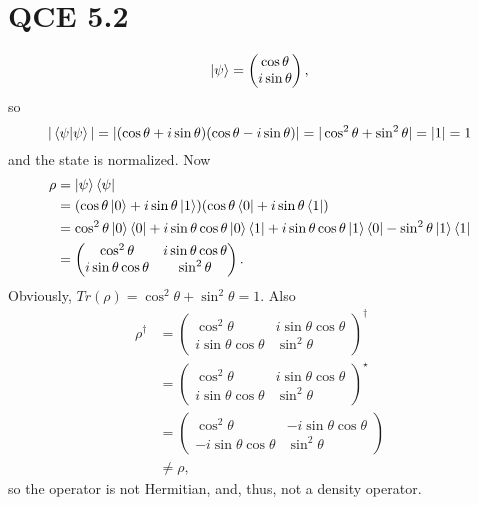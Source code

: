 \documentclass[10pt]{article}
\begin{document}
\section*{QCE 5.2}
\[
\ket{\psi} = \begin{pmatrix}
\cos \theta \\
i \sin \theta
\end{pmatrix},
\]
so 
\[
|\braket{\psi|\psi}| = |(\cos \theta + i \sin \theta)( \cos \theta - i \sin \theta )| = |\cos^2 \theta + \sin^2 \theta| = |1| = 1
\]
and the state is normalized.
Now 
\begin{align*}
\rho &= \ket{\psi} \bra{\psi} \\
        &= ( \cos \theta \ket{0} + i \sin \theta \ket{1} ) ( \cos \theta \bra{0} + i \sin \theta \bra{1} ) \\
        &= \cos^2 \theta \ket{0} \bra{0} + i \sin \theta \cos \theta \ket{0} \bra{1} + i \sin \theta \cos \theta \ket{1} \bra{0} - \sin^2 \theta \ket{1} \bra{1} \\
        &= \begin{pmatrix}
        \cos^2 \theta & i \sin \theta \cos \theta \\
        i \sin \theta \cos \theta & \sin^2 \theta
        \end{pmatrix}.
\end{align*}
Obviously, $Tr(\rho) = \cos^2 \theta + \sin^2 \theta = 1$. 
Also 
\begin{align*}
\rho^{\dag} &= \begin{pmatrix}
        \cos^2 \theta & i \sin \theta \cos \theta \\
        i \sin \theta \cos \theta & \sin^2 \theta
        \end{pmatrix}^{\dag} \\
        &= 
        \begin{pmatrix}
        \cos^2 \theta & i \sin \theta \cos \theta \\
        i \sin \theta \cos \theta & \sin^2 \theta
        \end{pmatrix}^{\star} \\
        &= 
        \begin{pmatrix}
        \cos^2 \theta & -i \sin \theta \cos \theta \\
        -i \sin \theta \cos \theta & \sin^2 \theta
        \end{pmatrix} \\
        &\neq \rho,
\end{align*}
so the operator is not Hermitian, and, thus, not a density operator.
\end{document}
